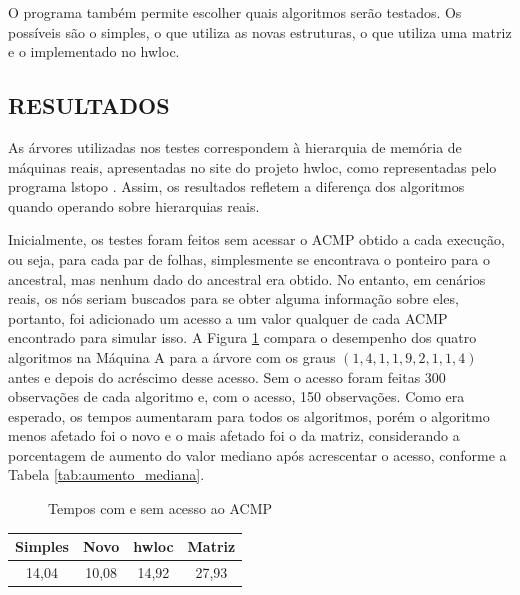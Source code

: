 O programa também permite escolher quais algoritmos serão testados.
Os possíveis são o simples, o que utiliza as novas estruturas, o que utiliza uma matriz e o implementado no hwloc.



\subsection{RESULTADOS}

As árvores utilizadas nos testes correspondem à hierarquia de memória de máquinas reais, apresentadas no site do projeto hwloc, como representadas pelo programa lstopo \cite{lstopo}.
Assim, os resultados refletem a diferença dos algoritmos quando operando sobre hierarquias reais.


Inicialmente, os testes foram feitos sem acessar o ACMP obtido a cada execução, ou seja, para cada par de folhas, simplesmente se encontrava o ponteiro para o ancestral, mas nenhum dado do ancestral era obtido.
No entanto, em cenários reais, os nós seriam buscados para se obter alguma informação sobre eles, portanto, foi adicionado um acesso a um valor qualquer de cada ACMP encontrado para simular isso.
A Figura \ref{fig:box_sem_com} compara o desempenho dos quatro algoritmos na Máquina A para a árvore com os graus $(1, 4, 1, 1, 9, 2, 1, 1, 4)$ antes e depois do acréscimo desse acesso.
Sem o acesso foram feitas 300 observações de cada algoritmo e, com o acesso, 150 observações.
Como era esperado, os tempos aumentaram para todos os algoritmos, porém o algoritmo menos afetado foi o novo e o mais afetado foi o da matriz, considerando a porcentagem de aumento do valor mediano após acrescentar o acesso, conforme a Tabela \ref{tab:aumento_mediana}.

\begin{figure}
	\caption{Tempos com e sem acesso ao ACMP}
	\label{fig:box_sem_com}
	\resizebox{\textwidth}{!}{}
\end{figure}

\begin{table}[htb]
	{\begin{tabular}{cccc}
		\toprule
		Simples & Novo & hwloc & Matriz \\
		\midrule 
		14,04 & 10,08 & 14,92 & 27,93 \\
		\bottomrule
	\end{tabular}}{}%
\end{table}



